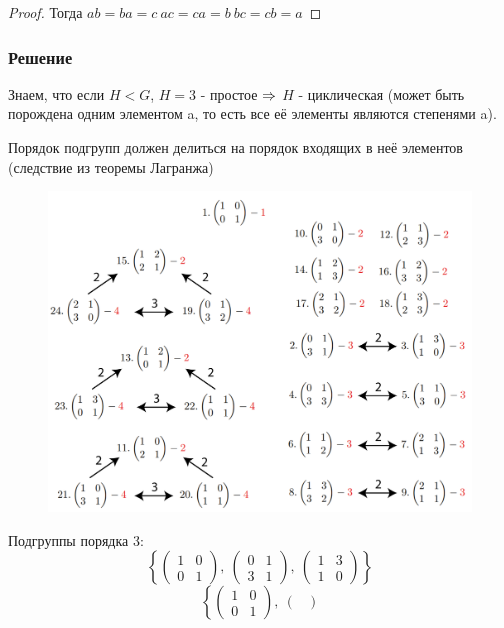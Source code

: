 \documentclass[11pt, fleqn]{article}
\begin{document}
\begin{enumerate}
\begin{proof}
          Тогда $ab=ba=c\ ac=ca=b\ bc=cb=a$
      \end{proof}

      \subsubsection{Решение}
      Знаем, что если $H < G$, $H=3$ - простое $\Rightarrow$ $H$ - циклическая (может быть порождена одним элементом a, то есть все её элементы являются степенями a).

      Порядок подгрупп должен делиться на порядок входящих в неё элементов (следствие из теоремы Лагранжа)\\
      \begin{figure}[h]
          \centering
          \includegraphics[width=13cm]{3_1.png}
      \end{figure}
      Подгруппы порядка 3:
      \[\left\{ \begin{pmatrix}
          1 & 0\\
          0 & 1
      \end{pmatrix},\ \begin{pmatrix}
          0 & 1\\
          3 & 1
      \end{pmatrix},\ \begin{pmatrix}
          1 & 3\\
          1 & 0
      \end{pmatrix}\right\}\]
      \[\left\{ \begin{pmatrix}
          1 & 0\\
          0 & 1
      \end{pmatrix},\ \begin{pmatrix}

\end{pmatrix}\]
\end{enumerate}
\end{document}
